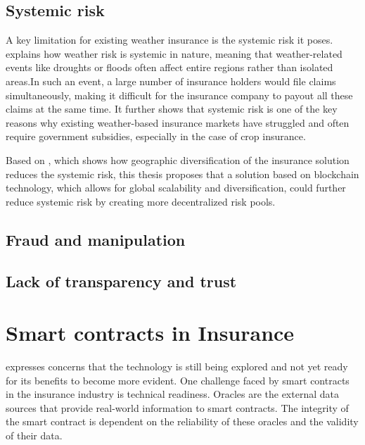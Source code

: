 \subsection{Systemic risk}

A key limitation for existing weather insurance is the systemic risk it poses. \autocite{xu2010systemic} explains how weather risk is systemic in nature, meaning that weather-related events like droughts or floods often affect entire regions rather than isolated areas.In such an event, a large number of insurance holders would file claims simultaneously, making it difficult for the insurance company to payout all these claims at the same time. It further shows that systemic risk is one of the key reasons why existing weather-based insurance markets have struggled and often require government subsidies, especially in the case of crop insurance. 

Based on \autocite{salgueiro2021diversification}, which shows how geographic diversification of the insurance solution reduces the systemic risk, this thesis proposes that a solution based on blockchain technology, which allows for global scalability and diversification, could further reduce systemic risk by creating more decentralized risk pools.

\subsection{Fraud and manipulation}



\subsection{Lack of transparency and trust}



\section{Smart contracts in Insurance}\label{section:smart_contracts_insurance}

\autocite{gatteschi2018blockchain} expresses concerns that the technology is still being explored and not yet ready for its benefits to become more evident. One challenge faced by smart contracts in the insurance industry is technical readiness. Oracles are the external data sources that provide real-world information to smart contracts. The integrity of the smart contract is dependent on the reliability of these oracles and the validity of their data. 

